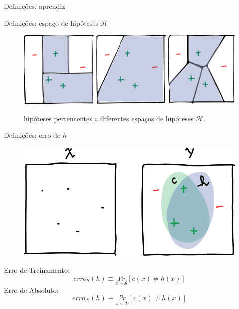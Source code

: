 \documentclass[10pt, professionalfonts]{beamer}
\begin{document}
{\begin{frame}{Definições: aprendiz}
\end{frame}
\begin{frame}{Definições: espaço de hipóteses  $\mathcal{H}$}
  \begin{figure}[!htp]
    \centering
    \includegraphics[width=.95\textwidth]{hspaces}
    \label{hspaces}
    \caption{hipóteses pertencentes a diferentes espaços de hipóteses $\mathcal{H}$.}
\end{figure}

\end{frame}

\begin{frame}{Definições: erro de $h$}
  \begin{figure}[!htp]
    \centering
    \includegraphics[width=.8\textwidth]{conceptVShypothesis}
    \label{conceptVShypothesis}
\end{figure}
Erro de Treinamento:\begin{equation}
  erro_{S}(h) \equiv \underset{x \sim \mathcal{S}}{Pr}[c(x) \neq h(x)]
\end{equation}
Erro de Absoluto:
\begin{equation}
  erro_{\mathcal{D}}(h) \equiv \underset{x \sim \mathcal{D}}{Pr}[c(x) \neq h(x)]
\end{equation}
\end{frame}

}
\end{document}
